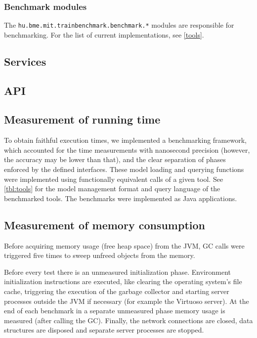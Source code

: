 \subsubsection{Benchmark modules}

The \texttt{hu.bme.mit.trainbenchmark.benchmark.*} modules are responsible for benchmarking. For the list of current implementations, see \autoref{tools}.


\subsection{Services}

\subsection{API}

\subsection{Measurement of running time}

To obtain faithful execution times, we implemented a benchmarking framework,
which accounted for the time measurements with nanosecond precision (however, the accuracy may be lower than that),
 and the clear separation of phases enforced by the defined
interfaces. These model loading and querying functions were implemented using
functionally equivalent calls of a given tool. See \autoref{tbl:tools} for
the model management format and query language of the benchmarked tools. The
benchmarks were implemented as Java applications.

\subsection{Measurement of memory consumption}
Before acquiring memory usage (free heap space) from the JVM, GC calls were triggered five times to sweep unfreed objects from the memory.

Before every test
there is an unmeasured initialization phase. Environment initialization
instructions are executed, like clearing the operating system's file cache, triggering the
execution of the garbage collector and starting server processes outside the
JVM if necessary (for example the Virtuoso server). At the end of each benchmark
in a separate unmeasured phase memory usage is measured (after calling the GC).
Finally, the network connections are closed, data structures are disposed and
separate server processes are stopped.


